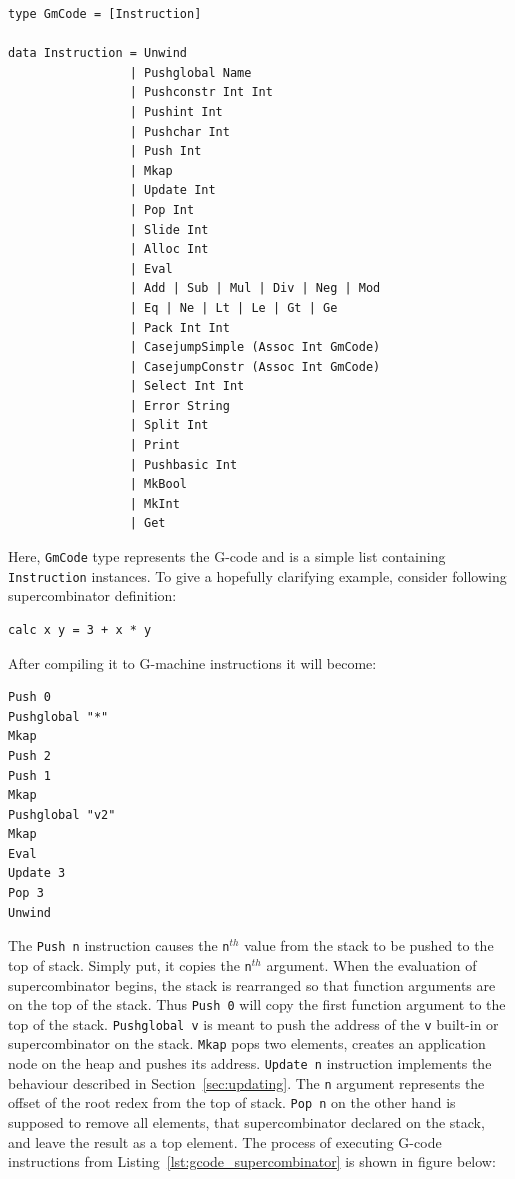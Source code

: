 \documentclass[12pt,a4paper]{report}
\begin{document}
\vspace*{0.2in}
\begin{lstlisting}[style=haskell]
type GmCode = [Instruction]

data Instruction = Unwind
                 | Pushglobal Name
                 | Pushconstr Int Int
                 | Pushint Int
                 | Pushchar Int
                 | Push Int
                 | Mkap
                 | Update Int
                 | Pop Int
                 | Slide Int
                 | Alloc Int
                 | Eval
                 | Add | Sub | Mul | Div | Neg | Mod
                 | Eq | Ne | Lt | Le | Gt | Ge
                 | Pack Int Int
                 | CasejumpSimple (Assoc Int GmCode)
                 | CasejumpConstr (Assoc Int GmCode)
                 | Select Int Int
                 | Error String
                 | Split Int
                 | Print
                 | Pushbasic Int
                 | MkBool
                 | MkInt
                 | Get
\end{lstlisting}

Here, \texttt{GmCode} type represents the G-code and is a simple list containing
\texttt{Instruction} instances. To give a hopefully clarifying example,
consider following supercombinator definition:

\vspace*{0.2in}
\begin{lstlisting}[style=haskell,label=lst:sc_to_compile,caption=Supercombinator to compile.]
calc x y = 3 + x * y
\end{lstlisting}

After compiling it to G-machine instructions it will become:

\vspace*{0.2in}
\begin{lstlisting}[style=haskell,label=lst:gcode_supercombinator,caption={Compiled
  supercombinator body.}]
Push 0
Pushglobal "*"
Mkap
Push 2
Push 1
Mkap
Pushglobal "v2"
Mkap
Eval
Update 3
Pop 3
Unwind
\end{lstlisting}

The \texttt{Push n} instruction causes the \texttt{n}$^{th}$ value from the
stack to be pushed to the top of stack. Simply put, it copies the
\texttt{n}$^{th}$ argument. When the evaluation of supercombinator begins, the
stack is rearranged so that function arguments are on the top of the stack.
Thus \texttt{Push 0} will copy the first function argument to the top of the
stack. \texttt{Pushglobal v} is meant to push the address of the \texttt{v}
built-in or supercombinator on the stack. \texttt{Mkap} pops two elements,
creates an application node on the heap and pushes its address. \texttt{Update
n} instruction implements the behaviour described in
Section~\ref{sec:updating}. The \texttt{n} argument represents the offset of
the root redex from the top of stack. \texttt{Pop n} on the other hand is
supposed to remove all elements, that supercombinator declared on the stack,
and leave the result as a top element. The process of executing G-code
instructions from Listing~\ref{lst:gcode_supercombinator} is shown in figure
below:
\end{document}
